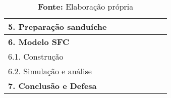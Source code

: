 \begin{table}[H]
{\begin{tabular}{ll|l|l|l|l|ll}
\textbf{5. Preparação sanduíche}\footnotemark &&&&\cellcolor[HTML]{9B9B9B}&\cellcolor[HTML]{9B9B9B}& \\ \hline

\textbf{6. Modelo SFC} &&&&\cellcolor[HTML]{9B9B9B}&\cellcolor[HTML]{9B9B9B}& \\ \hline
6.1. Construção &&&&\cellcolor[HTML]{9B9B9B}&& \\ \hline
6.2. Simulação e análise &&&&&\cellcolor[HTML]{9B9B9B}& \\ \hline

\textbf{7. Conclusão e Defesa} & & &  &  & & \cellcolor[HTML]{9B9B9B} \\ \hline \hline
		
	

\end{tabular}%
	\renewcommand{\arraystretch}{0.4}
	}
\caption*{\textbf{Fonte:} Elaboração própria}
\end{table}




\begin{comment}

\end{comment}




